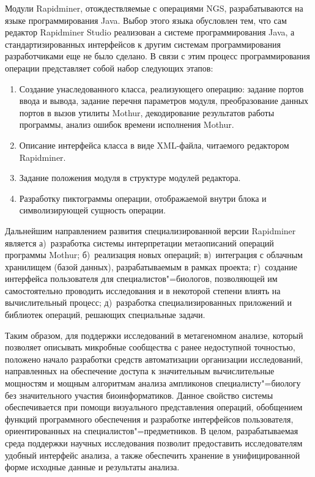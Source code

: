 \documentclass[a4paper,12pt,openany,final]{extreport}
\begin{document}
Модули Rapidminer, отождествляемые с операциями NGS, разрабатываются на языке программирования Java. Выбор этого языка обусловлен тем, что сам редактор Rapidminer Studio реализован а системе программирования Java, а стандартизированных интерфейсов к другим системам программирования разработчиками еще не было сделано. В связи с этим процесс программирования операции представляет собой набор следующих этапов:

\begin{enumerate}
\item Создание унаследованного класса, реализующего операцию: задание портов ввода и вывода, задание перечня параметров модуля, преобразование данных портов в вызов утилиты Mothur, декодирование результатов работы программы, анализ ошибок времени исполнения Mothur.
\item Описание интерфейса класса в виде XML-файла, читаемого редактором Rapidminer.
\item Задание положения модуля в структуре модулей редактора.
\item Разработку пиктограммы операции, отображаемой внутри блока и символизирующей сущность операции.
\end{enumerate}

Дальнейшим направлением развития специализированной версии Rapidminer является а)~разработка системы интерпретации метаописаний операций программы Mothur; б)~реализация новых операций; в)~интеграция с облачным хранилищем (базой данных), разрабатываемым в рамках проекта; г)~создание интерфейса пользователя для специалистов"=биологов, позволяющей им самостоятельно проводить исследования и в некоторой степени влиять на вычислительный процесс; д)~разработка специализированных приложений и библиотек операций, решающих специальные задачи.

Таким образом, для поддержки исследований в метагеномном анализе, который позволяет описывать микробные сообщества с ранее недоступной точностью, положено начало разработки средств автоматизации организации исследований, направленных на обеспечение доступа к значительным вычислительные мощностям и мощным алгоритмам анализа ампликонов специалисту"=биологу без значительного участия биоинформатиков. Данное свойство системы обеспечивается при помощи визуального представления операций, обобщением функций программного обеспечения и разработке интерфейсов пользователя, ориентированных на специалистов"=предметников.  В целом, разрабатываемая среда поддержки научных исследования позволит предоставить исследователям удобный интерфейс анализа, а также обеспечить хранение в унифицированной форме исходные данные и результаты анализа.
\end{document}
